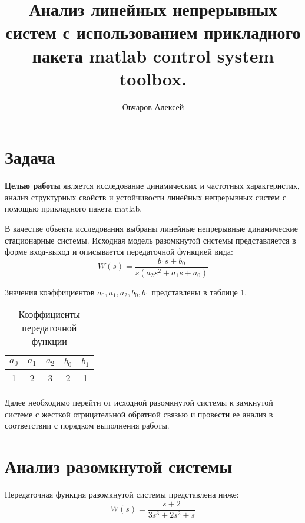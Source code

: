 \documentclass[a4paper, 12pt]{article}
\author{Овчаров Алексей}
\title{Анализ линейных непрерывных систем с использованием прикладного пакета matlab control system 
toolbox.}
\begin{document}
\maketitle

\section{Задача}
\textbf{Целью работы} является исследование динамических и частотных характеристик, анализ структурных свойств и устойчивости линейных непрерывных систем с помощью прикладного пакета matlab. \par
В качестве объекта исследования выбраны линейные непрерывные динамические стационарные системы. Исходная модель разомкнутой системы представляется в форме вход-выход и описывается передаточной функцией вида: 
\begin{equation} 
    W(s) = \frac{b_1s + b_0}{s(a_2s^2 + a_1s + a_0)}
\end{equation} \par
Значения коэффициентов $a_0, a_1, a_2, b_0, b_1$ представлены в таблице 1. \par
\begin{table} [h!]
    \centering
    \begin{threeparttable}
        \caption{Коэффициенты передаточной функции}
        \begin{tabular}{|c|c|c|c|c|}
            \hline
            $a_0$ & $a_1$ & $a_2$ & $b_0$ & $b_1$ \\ \hline
            1 & 2 & 3 & 2 & 1 \\ \hline
        \end{tabular}
    \end{threeparttable}
\end{table}
Далее необходимо перейти от исходной разомкнутой системы к замкнутой системе с жесткой отрицательной обратной связью и провести ее анализ в соответствии с порядком выполнения работы.

\newpage
\section{Анализ разомкнутой системы}
Передаточная функция разомкнутой системы представлена ниже:
\begin{equation}
    W(s) = \frac{s + 2}{3s^3 + 2s^2 + s}
\end{equation}
\end{document}
